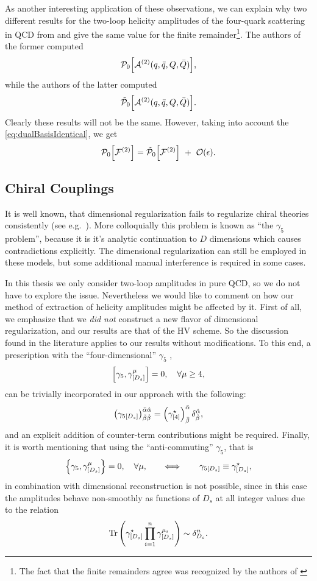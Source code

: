 As another interesting application of these observations, we can explain why 
two different results for the two-loop helicity amplitudes of the four-quark scattering in QCD
from \cite{Glover:2004si} and \cite{DeFreitas:2004kmi} give the same
value for the finite remainder\footnote{The fact that the finite remainders agree was recognized by the authors of \cite{DeFreitas:2004kmi}}.
The authors of the former computed 
\[
  \mathcal{P}_0\qty[\mathcal{A}^{(2)}(q,\bar{q},Q,\bar{Q})],
\]
while the authors of the latter computed
\[
  \tilde{\mathcal{P}}_0\qty[\mathcal{A}^{(2)}(q,\bar{q},Q,\bar{Q})].
\]
Clearly these results will not be the same. 
However, taking into account the \cref{eq:dualBasisIdentical}, we get
\[
  \mathcal{P}_0\qty[\mathcal{F}^{(2)}] = \tilde{\mathcal{P}}_0\qty[\mathcal{F}^{(2)}] ~+~ \order{\epsilon}.
\]

\subsection{Chiral Couplings}

It is well known, that dimensional regularization fails to regularize chiral theories consistently
(see e.g.\ \cite{Larin:1993tq,Boughezal:2019xpp,Jegerlehner:2000dz,Bonneau:1980yb,Bruque:2018bmy,Baikov:1991qz,Kreimer:1989ke}).
More colloquially this problem is known as ``the $\gamma_5$ problem'', because it is it's analytic
continuation to $D$ dimensions which causes contradictions explicitly.
The dimensional regularization can still be employed in these models, 
but some additional manual interference is required in some cases. 

In this thesis we only consider two-loop amplitudes in pure QCD, so we do not have to explore the issue. 
Nevertheless we would like to comment on how our method of extraction of helicity amplitudes might be affected by it.
First of all, we emphasize that we \emph{did not} construct a new flavor of dimensional regularization,
and our results are that of the HV scheme.  So the discussion found in the literature applies to our results without modifications.
To this end, a prescription with  the ``four-dimensional'' $\gamma_5$ \cite{tHooft:1972tcz,Breitenlohner:1977hr,Larin:1993tq},
\[\commutator{\gamma_{5}}{\gamma^{\mu}_{[D_s]}}=0, \quad \forall \mu\geq 4,\]
can be trivially incorporated in our approach with the following:
\[
  \qty(\gamma_{5[D_s]})^{\bar{\alpha}\hat{\alpha}}_{\bar{\beta}\hat{\beta}} = \qty(\gamma^\star_{[4]})^{\bar{\alpha}}_{\bar{\beta}}\,\delta^{\hat{\alpha}}_{\hat{\beta}},
\]
and an explicit addition of counter-term contributions might be required.
Finally, it is worth mentioning that using the ``anti-commuting'' $\gamma_5$, that is
\[
  \anticommutator{\gamma_{5}}{\gamma^{\mu}_{[D_s]}}=0, \quad \forall \mu, \qquad\Longleftrightarrow\qquad \gamma_{5[D_s]} \equiv \gamma^\star_{[D_s]},
\]
in combination with dimensional reconstruction is not possible, since
in this case the amplitudes behave non-smoothly as functions of $D_s$ at all integer values due to the relation
\begin{equation}
  \Tr\qty(\gamma^\star_{[D_s]} \prod_{i=1}^{n} \gamma^{\mu_i}_{[D_s]}) \sim \delta^n_{D_s}.
\end{equation}


